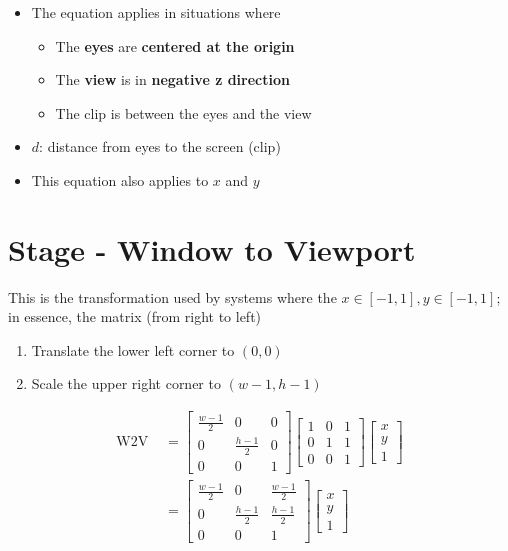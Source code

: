     \begin{itemize}
      \item The equation applies in situations where
      \begin{itemize}
        \item The \textbf{eyes} are \textbf{centered at the origin}
        \item The \textbf{view} is in \textbf{negative z direction}
        \item The clip is between the eyes and the view
      \end{itemize}

      \item $ d $: distance from eyes to the screen (clip)
      \item This equation also applies to $ x $ and $ y $
    \end{itemize}

\section{Stage - Window to Viewport}

  This is the transformation used by systems where the
  $ x \in \left[ -1, 1 \right], y \in \left[ -1, 1 \right] $; in essence,
  the matrix (from right to left)

  \begin{enumerate}
    \item Translate the lower left corner to $ \left( 0, 0 \right) $
    \item Scale the upper right corner to $ \left( w - 1, h - 1 \right) $
  \end{enumerate}

  \begin{align}
    \text{W2V } &=
    \begin{bmatrix}
      \frac{w - 1}{2} & 0 & 0 \\
      0 & \frac{h - 1}{2} & 0 \\
      0 & 0 & 1
    \end{bmatrix}
    \begin{bmatrix}
      1 & 0 & 1 \\
      0 & 1 & 1 \\
      0 & 0 & 1
    \end{bmatrix}
    \begin{bmatrix}
      x \\
      y \\
      1
    \end{bmatrix} \\
    &=
    \begin{bmatrix}
      \frac{w - 1}{2} & 0 & \frac{w - 1}{2} \\
      0 & \frac{h - 1}{2} & \frac{h - 1}{2} \\
      0 & 0 & 1
    \end{bmatrix}
    \begin{bmatrix}
      x \\
      y \\
      1
    \end{bmatrix}
  \end{align}

